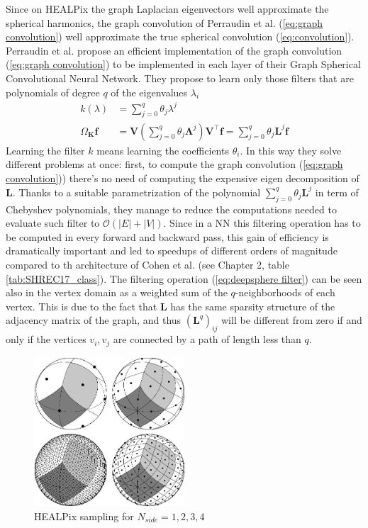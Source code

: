  Since on HEALPix the graph Laplacian eigenvectors well approximate the spherical harmonics, the graph convolution of Perraudin et al. (\ref{eq:graph convolution}) well approximate the true spherical convolution (\ref{eq:convolution}). Perraudin et al. propose an efficient implementation of the graph convolution (\ref{eq:graph convolution}) to be implemented in each layer of their Graph Spherical Convolutional Neural Network. They propose to learn only those filters that are polynomials of degree $q$ of the eigenvalues $\lambda_i$
\begin{equation}\label{eq:deepsphere filter}
\begin{aligned}
k(\lambda) &= \sum_{j=0}^{q} \theta_{j} \lambda^{j}\\ 
\Omega_\mathbf K \mathbf f &= \boldsymbol{V}\left(\sum_{j=0}^{q} \theta_{j} \boldsymbol{\Lambda}^{j}\right) \boldsymbol{V}^{\top} \boldsymbol{f}=\sum_{j=0}^{q} \theta_{j} \boldsymbol{L}^{j} \boldsymbol{f}
\end{aligned}
\end{equation}
Learning the filter $k$ means learning the coefficients $\theta_i$. In this way they solve different problems at once: first, to compute the graph convolution (\ref{eq:graph convolution})) there's no need of computing the expensive eigen decomposition of $\mathbf L$. Thanks to a suitable parametrization of the polynomial $\sum_{j=0}^{q} \theta_{j} \boldsymbol{L}^{j}$ in term of Chebyshev polynomials, they manage to reduce the computations needed to evaluate such filter to $\mathcal O(|E|+|V|)$. Since in a NN this filtering operation has to be computed in every forward and backward pass, this gain of efficiency is dramatically important and led to speedups of different orders of magnitude compared to th architecture of Cohen et al. (see Chapter 2, table \ref{tab:SHREC17_class}). The filtering operation (\ref{eq:deepsphere filter}) can be seen also in the vertex domain as a weighted sum of the $q$-neighborhoods of each vertex. This is due to the fact that $\mathbf L $ has the same sparsity structure of the adjacency matrix of the graph, and thus $(\mathbf L^q)_{ij}$ will be different from zero if and only if the vertices $v_i, v_j$ are connected by a path of length less than $q$. 

\begin{figure}
	\centering
	\includegraphics[width=0.5\textwidth]{figs/chapter1/healpix.jpg}
	\caption{\label{fig:healpix sampling}HEALPix sampling for $N_{side}=1,2,3,4$}
\end{figure}

